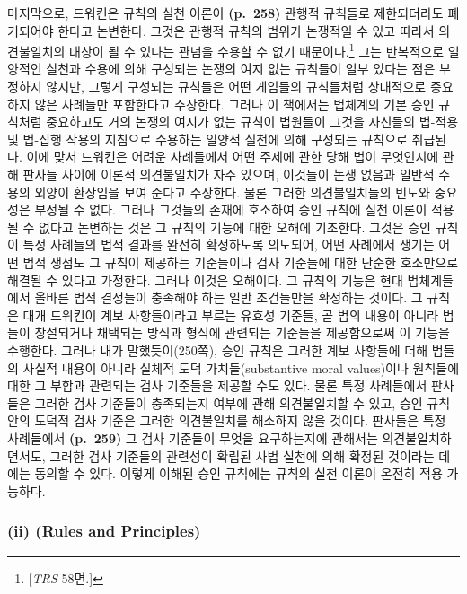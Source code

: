 마지막으로, 드워킨은 규칙의 실천 이론이 \textbf{(p.~258)} 관행적
규칙들로 제한되더라도 폐기되어야 한다고 논변한다. 그것은 관행적 규칙의
범위가 논쟁적일 수 있고 따라서 의견불일치의 대상이 될 수 있다는 관념을
수용할 수 없기 때문이다.\footnote{{[}\emph{TRS} 58면.{]}} 그는
반복적으로 일양적인 실천과 수용에 의해 구성되는 논쟁의 여지 없는
규칙들이 일부 있다는 점은 부정하지 않지만, 그렇게 구성되는 규칙들은 어떤
게임들의 규칙들처럼 상대적으로 중요하지 않은 사례들만 포함한다고
주장한다. 그러나 이 책에서는 법체계의 기본 승인 규칙처럼 중요하고도 거의
논쟁의 여지가 없는 규칙이 법원들이 그것을 자신들의 법-적용 및 법-집행
작용의 지침으로 수용하는 일양적 실천에 의해 구성되는 규칙으로 취급된다.
이에 맞서 드워킨은 어려운 사례들에서 어떤 주제에 관한 당해 법이
무엇인지에 관해 판사들 사이에 이론적 의견불일치가 자주 있으며, 이것들이
논쟁 없음과 일반적 수용의 외양이 환상임을 보여 준다고 주장한다. 물론
그러한 의견불일치들의 빈도와 중요성은 부정될 수 없다. 그러나 그것들의
존재에 호소하여 승인 규칙에 실천 이론이 적용될 수 없다고 논변하는 것은
그 규칙의 기능에 대한 오해에 기초한다. 그것은 승인 규칙이 특정 사례들의
법적 결과를 완전히 확정하도록 의도되어, 어떤 사례에서 생기는 어떤 법적
쟁점도 그 규칙이 제공하는 기준들이나 검사 기준들에 대한 단순한
호소만으로 해결될 수 있다고 가정한다. 그러나 이것은 오해이다. 그 규칙의
기능은 현대 법체계들에서 올바른 법적 결정들이 충족해야 하는 일반
조건들만을 확정하는 것이다. 그 규칙은 대개 드워킨이 계보 사항들이라고
부르는 유효성 기준들, 곧 법의 내용이 아니라 법들이 창설되거나 채택되는
방식과 형식에 관련되는 기준들을 제공함으로써 이 기능을 수행한다. 그러나
내가 말했듯이(250쪽), 승인 규칙은 그러한 계보 사항들에 더해 법들의
사실적 내용이 아니라 실체적 도덕 가치들(substantive moral values)이나
원칙들에 대한 그 부합과 관련되는 검사 기준들을 제공할 수도 있다. 물론
특정 사례들에서 판사들은 그러한 검사 기준들이 충족되는지 여부에 관해
의견불일치할 수 있고, 승인 규칙 안의 도덕적 검사 기준은 그러한
의견불일치를 해소하지 않을 것이다. 판사들은 특정 사례들에서
\textbf{(p.~259)} 그 검사 기준들이 무엇을 요구하는지에 관해서는
의견불일치하면서도, 그러한 검사 기준들의 관련성이 확립된 사법 실천에
의해 확정된 것이라는 데에는 동의할 수 있다. 이렇게 이해된 승인 규칙에는
규칙의 실천 이론이 온전히 적용 가능하다.

\subsubsection{\texorpdfstring{(ii)  (Rules and
Principles)}{(ii) 규칙들과 원칙들 (Rules and Principles)}}\label{ii-uxaddcuxce59uxb4e4uxacfc-uxc6d0uxce59uxb4e4-rules-and-principles}

